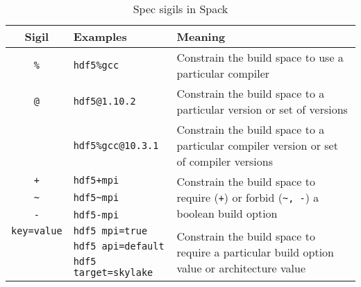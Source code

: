 

\begin{table}
    \caption[Table caption text]{Spec sigils in Spack}
    \label{tab:sigil}
    \centering
    \footnotesize
    \begin{tabular}{clp{3.5cm}}
        \hline
        \textbf{Sigil} & \textbf{Examples} & \textbf{Meaning} \\
        \hline
        \texttt{\%} & \texttt{hdf5\%gcc}    & Constrain the build space to use a particular compiler \\
        \hline
        \texttt{@}  & \texttt{hdf5@1.10.2}  & Constrain the build space to a particular version or set of versions \\
                    & \texttt{hdf5\%gcc@10.3.1} & Constrain the build space to a particular compiler version or set of compiler versions \\
        \hline
        \texttt{+}  & \texttt{hdf5+mpi}     & \multirow{3}{3.5cm}{Constrain the build space to require (\texttt{+}) or forbid (\texttt{\~{}, -}) a boolean build option} \\
        \texttt{\~} & \texttt{hdf5\~{}mpi}    \\
        \texttt{-}  & \texttt{hdf5-mpi}       \\
        \hline
        \texttt{key=value} & \texttt{hdf5 mpi=true} & \multirow{3}{3.5cm}{Constrain the build space to require a particular build option value or architecture value} \\
                           & \texttt{hdf5 api=default}      \\
                           & \texttt{hdf5 target=skylake}   \\
    \end{tabular}
\end{table}

